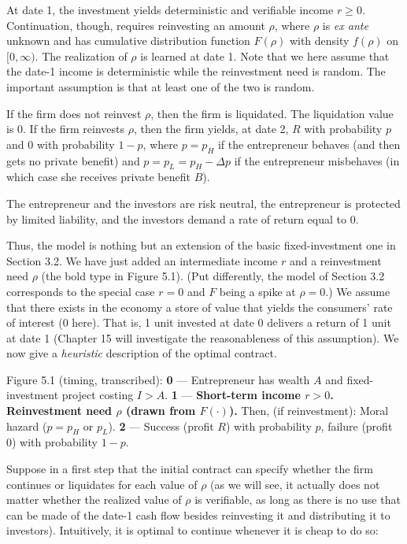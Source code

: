 \documentclass[11pt,a4paper]{article}
\begin{document}
At date 1, the investment yields deterministic and verifiable income \(r \geqslant 0\).
Continuation, though, requires reinvesting an amount \(\rho\), where \(\rho\) is \emph{ex ante}
unknown and has cumulative distribution function \(F(\rho)\) with density \(f(\rho)\) on
\([0, \infty)\). The realization of \(\rho\) is learned at date 1. Note that we here assume that the
date-1 income is deterministic while the reinvestment need is random. The important assumption is
that at least one of the two is random.

If the firm does not reinvest \(\rho\), then the firm is liquidated. The liquidation value is 0. If
the firm reinvests \(\rho\), then the firm yields, at date 2, \(R\) with probability \(p\) and 0
with probability \(1 - p\), where \(p = p_H\) if the entrepreneur behaves (and then gets no private
benefit) and \(p = p_L = p_H - \Delta p\) if the entrepreneur misbehaves (in which case she receives
private benefit \(B\)).

The entrepreneur and the investors are risk neutral, the entrepreneur is protected by limited
liability, and the investors demand a rate of return equal to 0.

Thus, the model is nothing but an extension of the basic fixed-investment one in Section 3.2. We
have just added an intermediate income \(r\) and a reinvestment need \(\rho\) (the bold type in
Figure 5.1). (Put differently, the model of Section 3.2 corresponds to the special case \(r = 0\)
and \(F\) being a spike at \(\rho = 0\).) We assume that there exists in the economy a store of
value that yields the consumers' rate of interest (0 here). That is, 1 unit invested at date 0
delivers a return of 1 unit at date 1 (Chapter 15 will investigate the reasonableness of this
assumption). We now give a \emph{heuristic} description of the optimal contract.

Figure 5.1 (timing, transcribed): \textbf{0} --- Entrepreneur has wealth \(A\) and fixed-investment
project costing \(I > A\). \textbf{1} --- \textbf{Short-term income \(r > 0\). Reinvestment need
\(\rho\) (drawn from \(F(\cdot)\)).} Then, (if reinvestment): Moral hazard (\(p = p_H\) or \(p_L\)).
\textbf{2} --- Success (profit \(R\)) with probability \(p\), failure (profit 0) with probability
\(1 - p\).

Suppose in a first step that the initial contract can specify whether the firm continues or
liquidates for each value of \(\rho\) (as we will see, it actually does not matter whether the
realized value of \(\rho\) is verifiable, as long as there is no use that can be made of the date-1
cash flow besides reinvesting it and distributing it to investors). Intuitively, it is optimal to
continue whenever it is cheap to do so:
\end{document}

